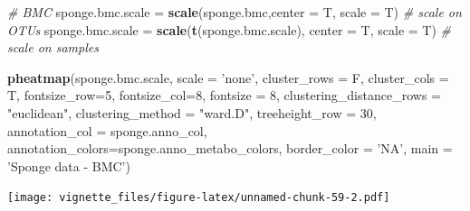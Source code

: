 \documentclass[]{book}
\newenvironment{Shaded}{\begin{snugshade}}{\end{snugshade}}
\newcommand{\KeywordTok}[1]{\textcolor[rgb]{0.13,0.29,0.53}{\textbf{#1}}}
\newcommand{\DataTypeTok}[1]{\textcolor[rgb]{0.13,0.29,0.53}{#1}}
\newcommand{\DecValTok}[1]{\textcolor[rgb]{0.00,0.00,0.81}{#1}}
\newcommand{\StringTok}[1]{\textcolor[rgb]{0.31,0.60,0.02}{#1}}
\newcommand{\CommentTok}[1]{\textcolor[rgb]{0.56,0.35,0.01}{\textit{#1}}}
\newcommand{\NormalTok}[1]{#1}
\begin{document}
\begin{Shaded}
\begin{Highlighting}[]
\CommentTok{# BMC }
\NormalTok{sponge.bmc.scale =}\StringTok{ }\KeywordTok{scale}\NormalTok{(sponge.bmc,}\DataTypeTok{center =}\NormalTok{ T, }\DataTypeTok{scale =}\NormalTok{ T) }\CommentTok{# scale on OTUs}
\NormalTok{sponge.bmc.scale =}\StringTok{ }\KeywordTok{scale}\NormalTok{(}\KeywordTok{t}\NormalTok{(sponge.bmc.scale), }\DataTypeTok{center =}\NormalTok{ T, }\DataTypeTok{scale =}\NormalTok{ T) }\CommentTok{# scale on samples}

\KeywordTok{pheatmap}\NormalTok{(sponge.bmc.scale, }
         \DataTypeTok{scale =} \StringTok{'none'}\NormalTok{, }
         \DataTypeTok{cluster_rows =}\NormalTok{ F, }
         \DataTypeTok{cluster_cols =}\NormalTok{ T, }
         \DataTypeTok{fontsize_row=}\DecValTok{5}\NormalTok{, }\DataTypeTok{fontsize_col=}\DecValTok{8}\NormalTok{,}
         \DataTypeTok{fontsize =} \DecValTok{8}\NormalTok{,}
         \DataTypeTok{clustering_distance_rows =} \StringTok{"euclidean"}\NormalTok{,}
         \DataTypeTok{clustering_method =} \StringTok{"ward.D"}\NormalTok{,}
         \DataTypeTok{treeheight_row =} \DecValTok{30}\NormalTok{,}
         \DataTypeTok{annotation_col =}\NormalTok{ sponge.anno_col,}
         \DataTypeTok{annotation_colors=}\NormalTok{sponge.anno_metabo_colors,}
         \DataTypeTok{border_color =} \StringTok{'NA'}\NormalTok{,}
         \DataTypeTok{main =} \StringTok{'Sponge data - BMC'}\NormalTok{)}
\end{Highlighting}
\end{Shaded}

\texttt{[image: vignette\_files/figure-latex/unnamed-chunk-59-2.pdf]}
\end{document}
